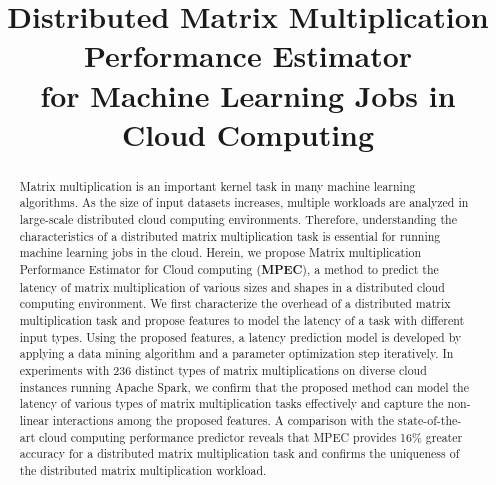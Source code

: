 \documentclass[10pt, conference, compsocconf]{IEEEtran}
\begin{document}

\title{Distributed Matrix Multiplication Performance Estimator \\for Machine Learning Jobs in Cloud Computing}

\author{
\and
{}
}

\maketitle

\begin{abstract}
  Matrix multiplication is an important kernel task in many machine learning algorithms. As the size of input datasets increases, multiple workloads are analyzed in large-scale distributed cloud computing environments. Therefore, understanding the characteristics of a distributed matrix multiplication task is essential for running machine learning jobs in the cloud. Herein, we propose Matrix multiplication Performance Estimator for Cloud computing (\textbf{MPEC}), a method to predict the latency of matrix multiplication of various sizes and shapes in a distributed cloud computing environment. We first characterize the overhead of a distributed matrix multiplication task and propose features to model the latency of a task with different input types. Using the proposed features, a latency prediction model is developed by applying a data mining algorithm and a parameter optimization step iteratively. In experiments with 236 distinct types of matrix multiplications on diverse cloud instances running Apache Spark, we confirm that the proposed method can model the latency of various types of matrix multiplication tasks effectively and capture the non-linear interactions among the proposed features. A comparison with the state-of-the-art cloud computing performance predictor reveals that MPEC provides 16\% greater accuracy for a distributed matrix multiplication task and confirms the uniqueness of the distributed matrix multiplication workload.
\end{abstract}
\end{document}
